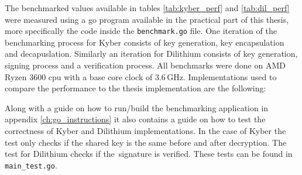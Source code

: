 The benchmarked values available in tables \ref{tab:kyber_perf} and \ref{tab:dil_perf} were measured using a go program available in the practical part of this thesis, more specifically the code inside the \texttt{benchmark.go} file. One iteration of the benchmarking process for Kyber consists of key generation, key encapsulation and decapuslation. Similarly an iteration for Dilithium consists of key generation, signing process and a verification process. All benchmarks were done on AMD Ryzen 3600 cpu with a base core clock of 3.6\,GHz. Implementations used to compare the performance to the thesis implementation are the following:
\begin{itemize}
\end{itemize}

Along with a guide on how to run/build the benchmarking application in appendix \ref{ch:go_instructions} it also contains a guide on how to test the correctness of Kyber and Dilithium implementations. In the case of Kyber the test only checks if the shared key is the same before and after decryption. The test for Dilithium checks if the~signature is verified. These tests can be found in \texttt{main\_test.go}.

